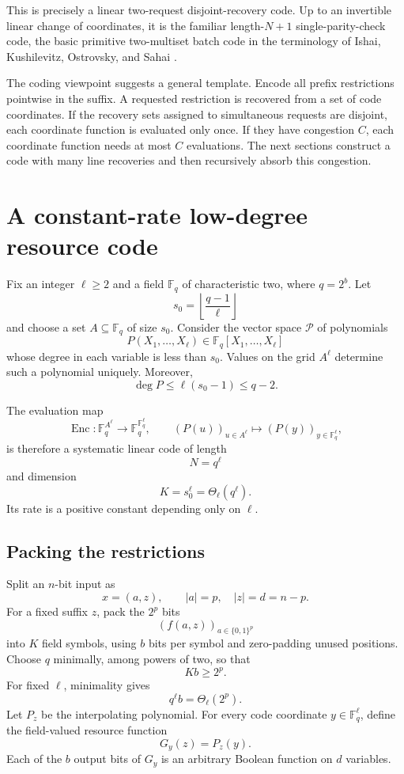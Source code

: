 \documentclass[11pt]{article}
\theoremstyle{definition}
\newcommand{\bits}{\{0,1\}}
\newcommand{\F}{\mathbb{F}}
\begin{document}
This is precisely a linear two-request disjoint-recovery code.  Up to an invertible linear change of coordinates, it is the familiar length-$N+1$ single-parity-check code, the basic primitive two-multiset batch code in the terminology of Ishai, Kushilevitz, Ostrovsky, and Sahai \cite{IKOS2004}.

The coding viewpoint suggests a general template.  Encode all prefix restrictions pointwise in the suffix.  A requested restriction is recovered from a set of code coordinates.  If the recovery sets assigned to simultaneous requests are disjoint, each coordinate function is evaluated only once.  If they have congestion $C$, each coordinate function needs at most $C$ evaluations.  The next sections construct a code with many line recoveries and then recursively absorb this congestion.

\section{A constant-rate low-degree resource code}

Fix an integer $\ell\ge2$ and a field $\F_q$ of characteristic two, where $q=2^b$.  Let
\[
 s_0=\left\lfloor\frac{q-1}{\ell}\right\rfloor
\]
and choose a set $A\subseteq\F_q$ of size $s_0$.  Consider the vector space $\mathcal P$ of polynomials
\[
 P(X_1,\ldots,X_\ell)\in\F_q[X_1,\ldots,X_\ell]
\]
whose degree in each variable is less than $s_0$.  Values on the grid $A^\ell$ determine such a polynomial uniquely.  Moreover,
\[
 \deg P\le \ell(s_0-1)\le q-2.
\]

The evaluation map
\[
 \operatorname{Enc}:\F_q^{A^\ell}\to\F_q^{\F_q^\ell},
 \qquad
 (P(u))_{u\in A^\ell}\mapsto(P(y))_{y\in\F_q^\ell},
\]
is therefore a systematic linear code of length
\[
 N=q^\ell
\]
and dimension
\[
 K=s_0^\ell=\Theta_\ell(q^\ell).
\]
Its rate is a positive constant depending only on $\ell$.

\subsection{Packing the restrictions}

Split an $n$-bit input as
\[
 x=(a,z),\qquad |a|=p,\quad |z|=d=n-p.
\]
For a fixed suffix $z$, pack the $2^p$ bits
\[
 (f(a,z))_{a\in\bits^p}
\]
into $K$ field symbols, using $b$ bits per symbol and zero-padding unused positions.  Choose $q$ minimally, among powers of two, so that
\[
 Kb\ge 2^p.
\]
For fixed $\ell$, minimality gives
\begin{equation}\label{eq:packing}
 q^\ell b=\Theta_\ell(2^p).
\end{equation}
Let $P_z$ be the interpolating polynomial.  For every code coordinate
$y\in\F_q^\ell$, define the field-valued resource function
\[
 G_y(z)=P_z(y).
\]
Each of the $b$ output bits of $G_y$ is an arbitrary Boolean function on $d$ variables.
\end{document}

